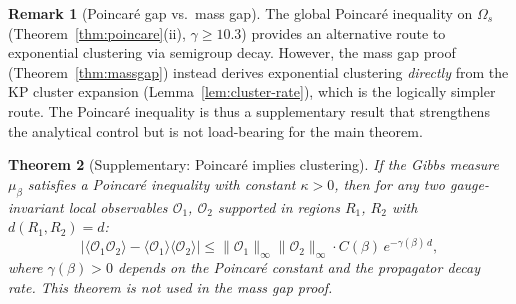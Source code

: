 \documentclass[11pt]{article}
\newtheorem{theorem}{Theorem}[section]
\theoremstyle{definition}
\newtheorem{remark}[theorem]{Remark}
\begin{document}
\begin{remark}[Poincar\'e gap vs.\ mass gap]
The global Poincar\'e inequality on $\Omega_s$
(Theorem~\ref{thm:poincare}(ii), $\gamma\ge 10.3$)
provides an alternative route to exponential clustering
via semigroup decay.  However, the mass gap proof
(Theorem~\ref{thm:massgap}) instead derives exponential
clustering \emph{directly} from the KP cluster expansion
(Lemma~\ref{lem:cluster-rate}), which is the logically
simpler route.  The Poincar\'e inequality is thus a
supplementary result that strengthens the analytical
control but is not load-bearing for the main theorem.
\end{remark}

\begin{theorem}[Supplementary: Poincar\'e implies clustering]
\label{thm:clustering}
If the Gibbs measure $\mu_\beta$ satisfies a Poincar\'e inequality
with constant $\kappa>0$, then for any
two gauge-invariant local observables $\mathcal{O}_1$, $\mathcal{O}_2$
supported in regions $R_1$, $R_2$ with $d(R_1,R_2)=d$:
\begin{equation}\label{eq:exp-cluster}
|\langle\mathcal{O}_1\mathcal{O}_2\rangle
-\langle\mathcal{O}_1\rangle\langle\mathcal{O}_2\rangle|
\le\|\mathcal{O}_1\|_\infty\|\mathcal{O}_2\|_\infty
\cdot C(\beta)\,e^{-\gamma(\beta)\,d},
\end{equation}
where $\gamma(\beta)>0$ depends on the Poincar\'e constant and the
propagator decay rate.
This theorem is not used in the mass gap proof.
\end{theorem}
\end{document}
